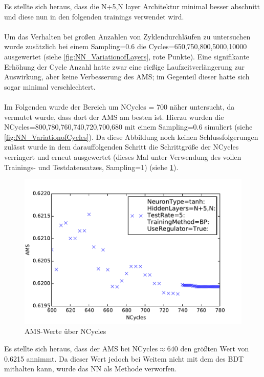 \noindent Es stellte sich heraus, dass die N+5,N layer Architektur minimal besser abschnitt und diese nun in den folgenden trainings verwendet wird. \\ \\
Um das Verhalten bei großen Anzahlen von Zyklendurchläufen zu untersuchen wurde zusätzlich bei einem Sampling=0.6 die Cycles=650,750,800,5000,10000 ausgewertet (siehe \ref{fig:NN_VariationofLayers}, rote Punkte). Eine signifikante Erhöhung der Cycle Anzahl hatte zwar eine rießige Laufzeitverlängerung zur Auswirkung, aber keine Verbesserung des AMS; im Gegenteil dieser hatte sich sogar minimal verschlechtert. \\ \\
Im Folgenden wurde der Bereich um NCycles = 700 näher untersucht, da vermutet wurde, dass dort der AMS am besten ist. Hierzu wurden die NCycles=800,780,760,740,720,700,680 mit einem Sampling=0.6 simuliert (siehe \ref{fig:NN_VariationofCycles}). Da diese Abbildung noch keinen Schlussfolgerungen zulässt wurde in dem darauffolgenden Schritt die Schrittgröße der NCycles verringert und erneut ausgewertet (dieses Mal unter Verwendung des vollen Trainings- und Testdatensatzes, Sampling=1) (siehe \ref{fig:NN_Variationlowstep}). 
\begin{figure}[tb]
\centering
\includegraphics[scale=1]{sections/parameter_optimization_ANN/plot6.pdf}
\caption{AMS-Werte über NCycles}
\label{fig:NN_Variationlowstep} 
\end{figure}
Es stellte sich heraus, dass der AMS bei NCycles$\approx$640 den größten Wert von 0.6215 annimmt. Da dieser Wert jedoch bei Weitem nicht mit dem des BDT mithalten kann, wurde das NN als Methode verworfen. \\ \\